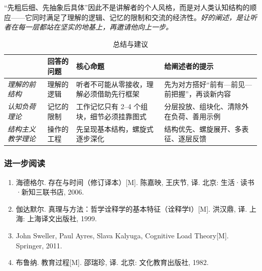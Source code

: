 “先粗后细、先抽象后具体”因此不是讲解者的个人风格，而是对人类认知结构的顺应——它同时满足了理解的逻辑、记忆的限制和交流的经济性。\textit{好的阐述，是让听者在每一层都站在坚实的地基上，再邀请他向上一步。}

\begin{table}[htbp]
    \centering
    \caption{总结与建议}
    \label{tab:three-perspectives-explanation}
    \begin{tabularx}{\textwidth}{l l >{\raggedright\arraybackslash}X >{\raggedright\arraybackslash}X}
        \toprule
        & \textbf{回答的问题} & \textbf{核心命题} & \textbf{给阐述者的提示} \\
        \midrule
        \textit{理解的前结构} & 理解的逻辑 & 听者不可能从零接收，理解必须借助先行框架 & 先为对方搭好“前有—前见—前把握”，再谈新内容 \\
        \textit{认知负荷理论} & 记忆的限制 & 工作记忆只有 2--4 个组块，细节必须挂靠图式 & 分层投放、组块化、清除外在负荷、善用示例 \\
        \textit{结构主义教学理论} & 操作的工程 & 先呈现基本结构，螺旋式逐步深化 & 结构优先、螺旋展开、多表征、逐层反馈 \\
        \bottomrule
    \end{tabularx}
\end{table}

\subsubsection{进一步阅读}

\begin{enumerate}
    \item 海德格尔. 存在与时间（修订译本）[M]. 陈嘉映, 王庆节, 译. 北京: 生活·读书·新知三联书店, 2006.
    \item 伽达默尔. 真理与方法：哲学诠释学的基本特征（诠释学Ⅰ）[M]. 洪汉鼎, 译. 上海: 上海译文出版社, 1999.
    \item John Sweller, Paul Ayres, Slava Kalyuga, Cognitive Load Theory[M]. Springer, 2011.
    \item 布鲁纳. 教育过程[M]. 邵瑞珍, 译. 北京: 文化教育出版社, 1982.
\end{enumerate}

